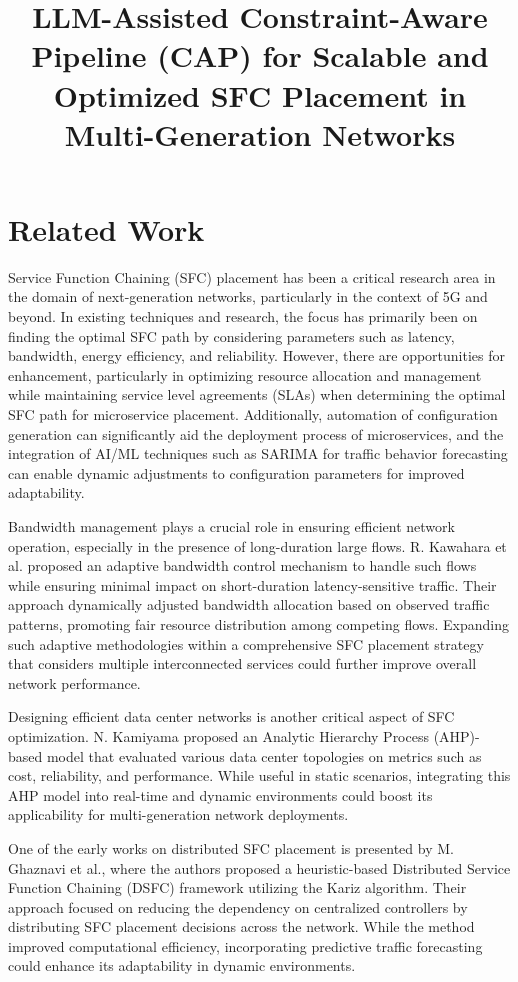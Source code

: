 \documentclass[conference]{IEEEtran}
\title{LLM-Assisted Constraint-Aware Pipeline (CAP) for Scalable and Optimized SFC Placement in Multi-Generation Networks}
\author{
	\IEEEauthorblockN{Author 1, Author 2, Author 3, Author 4}
	\IEEEauthorblockA{Department of Computer Science, University Name, Country\\
		Email: author1@example.com, author2@example.com, author3@example.com, author4@example.com}
}
\begin{document}
	
	\maketitle
	
\section{Related Work}

Service Function Chaining (SFC) placement has been a critical research area in the domain of next-generation networks, particularly in the context of 5G and beyond. In existing techniques and research, the focus has primarily been on finding the optimal SFC path by considering parameters such as latency, bandwidth, energy efficiency, and reliability. However, there are opportunities for enhancement, particularly in optimizing resource allocation and management while maintaining service level agreements (SLAs) when determining the optimal SFC path for microservice placement. Additionally, automation of configuration generation can significantly aid the deployment process of microservices, and the integration of AI/ML techniques such as SARIMA for traffic behavior forecasting can enable dynamic adjustments to configuration parameters for improved adaptability.

Bandwidth management plays a crucial role in ensuring efficient network operation, especially in the presence of long-duration large flows. R. Kawahara et al. proposed an adaptive bandwidth control mechanism to handle such flows while ensuring minimal impact on short-duration latency-sensitive traffic. Their approach dynamically adjusted bandwidth allocation based on observed traffic patterns, promoting fair resource distribution among competing flows. Expanding such adaptive methodologies within a comprehensive SFC placement strategy that considers multiple interconnected services could further improve overall network performance.

Designing efficient data center networks is another critical aspect of SFC optimization. N. Kamiyama proposed an Analytic Hierarchy Process (AHP)-based model that evaluated various data center topologies on metrics such as cost, reliability, and performance. While useful in static scenarios, integrating this AHP model into real-time and dynamic environments could boost its applicability for multi-generation network deployments.

One of the early works on distributed SFC placement is presented by M. Ghaznavi et al., where the authors proposed a heuristic-based Distributed Service Function Chaining (DSFC) framework utilizing the Kariz algorithm. Their approach focused on reducing the dependency on centralized controllers by distributing SFC placement decisions across the network. While the method improved computational efficiency, incorporating predictive traffic forecasting could enhance its adaptability in dynamic environments.
\end{document}
